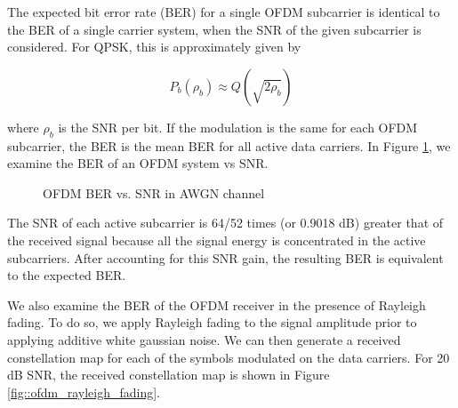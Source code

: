 \documentclass[conference]{IEEEtran}
\begin{document}
    		The expected bit error rate (BER) for a single OFDM subcarrier is identical to the BER of a single carrier system, when the SNR of the given subcarrier is considered. For QPSK, this is approximately given by
		
		\begin{equation}
			P_b(\rho_b) \approx Q(\sqrt{2\rho_b})
		\end{equation}
		
		where $\rho_b$ is the SNR per bit. If the modulation is the same for each OFDM subcarrier, the BER is the mean BER for all active data carriers. In Figure \ref{fig::ofdm_awgn_ber}, we examine the BER of an OFDM system vs SNR.
		
		\begin{figure}[H]
			\centering
    			\caption{OFDM BER vs. SNR in AWGN channel}
    			\label{fig::ofdm_awgn_ber}
		\end{figure}
		
		The SNR of each active subcarrier is 64/52 times (or 0.9018 dB) greater that of the received signal because all the signal energy is concentrated in the active subcarriers. After accounting for this SNR gain, the resulting BER is equivalent to the expected BER. 
        
        We also examine the BER of the OFDM receiver in the presence of Rayleigh fading. To do so, we apply Rayleigh fading to the signal amplitude prior to applying additive white gaussian noise. We can then generate a received constellation map for each of the symbols modulated on the data carriers. For 20 dB SNR, the received constellation map is shown in Figure \ref{fig::ofdm_rayleigh_fading}.
        
\end{document}
